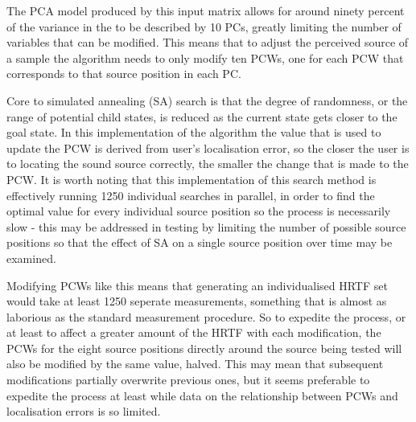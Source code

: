 The PCA model produced by this input matrix allows for around ninety percent of the variance in the to be described by 10 PCs, greatly limiting the number of variables that can be modified. This means that to adjust the perceived source of a sample the algorithm needs to only modify ten PCWs, one for each PCW that corresponds to that source position in each PC. 

Core to simulated annealing (SA) search is that the degree of randomness, or the range of potential child states, is reduced as the current state gets closer to the goal state. In this implementation of the algorithm the value that is used to update the PCW is derived from user's localisation error, so the closer the user is to locating the sound source correctly, the smaller the change that is made to the PCW. It is worth noting that this implementation of this search method is effectively running 1250 individual searches in parallel, in order to find the optimal value for every individual source position so the process is necessarily slow - this may be addressed in testing by limiting the number of possible source positions so that the effect of SA on a single source position over time may be examined.

Modifying PCWs like this means that generating an individualised HRTF set would take at least 1250 seperate measurements, something that is almost as laborious as the standard measurement procedure. So to expedite the process, or at least to affect a greater amount of the HRTF with each modification, the PCWs for the eight source positions directly around the source being tested will also be modified by the same value, halved. This may mean that subsequent modifications partially overwrite previous ones, but it seems preferable to expedite the process at least while data on the relationship between PCWs and localisation errors is so limited. 

